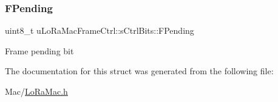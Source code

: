 \subsubsection{\texorpdfstring{F\+Pending}{FPending}}
{\footnotesize\ttfamily uint8\+\_\+t u\+Lo\+Ra\+Mac\+Frame\+Ctrl\+::s\+Ctrl\+Bits\+::\+F\+Pending}

Frame pending bit 

The documentation for this struct was generated from the following file\+:\begin{DoxyCompactItemize}
\item 
Mac/\hyperlink{LoRaMac_8h}{Lo\+Ra\+Mac.\+h}\end{DoxyCompactItemize}
